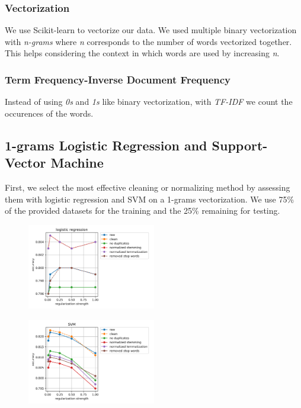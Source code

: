 \documentclass[11pt, a4paper, twocolumn]{article}
\begin{document}
\subsubsection{Vectorization}
We use Scikit-learn to vectorize our data. We used multiple binary vectorization with \textit{n-grams} where \textit{n} corresponds to the number of words vectorized together. This helps considering the context in which words are used by increasing \textit{n}.

\subsubsection{Term Frequency-Inverse Document Frequency}
Instead of using \textit{0s} and \textit{1s} like binary vectorization, with \textit{TF-IDF} we count the occurences of the words.

\subsection{1-grams Logistic Regression and Support-Vector Machine}
First, we select the most effective cleaning or normalizing method by assessing them with logistic regression and SVM on a 1-grams vectorization. We use 75\% of the provided datasets for the training and the 25\% remaining for testing.

\begin{figure}[h]
	\centering
	\includegraphics[width=0.5\textwidth]{../plots/logreg.png}
\end{figure}

\begin{figure}[h]
	\includegraphics[width=0.5\textwidth]{../plots/svm.png}
\end{figure}
\end{document}
